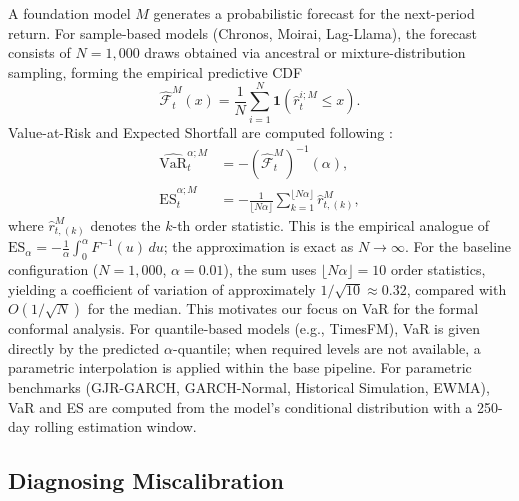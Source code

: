 \documentclass[preprint,11pt,authoryear]{elsarticle}
\newcommand{\VaR}{\mathrm{VaR}}
\newcommand{\ES}{\mathrm{ES}}
\newcommand{\1}{\boldsymbol{1}}
\newcommand{\Fhat}{\hat{\mathcal{F}}}
\begin{document}
	A foundation model $M$ generates a probabilistic forecast for
	the next-period return. For sample-based models (Chronos,
	Moirai, Lag-Llama), the forecast consists of $N=1{,}000$ draws
	obtained via ancestral or mixture-distribution sampling,
	forming the empirical predictive CDF
	\[
	\Fhat_t^M(x) = \frac{1}{N}\sum_{i=1}^{N}
	\1(\hat{r}_t^{i;M}\leq x).
	\]
	Value-at-Risk and Expected Shortfall are computed following
	\citet{pele2025llmvar}:
	\begin{align}
		\widehat{\VaR}_t^{\alpha;M}
		&= -(\Fhat_t^M)^{-1}(\alpha), \\
		\widehat{\ES}_t^{\alpha;M}
		&= -\frac{1}{\lfloor N\alpha\rfloor}
		\sum_{k=1}^{\lfloor N\alpha\rfloor}\hat{r}_{t,(k)}^M,
	\end{align}
	where $\hat{r}_{t,(k)}^M$ denotes the $k$-th order statistic.
	This is the empirical analogue of
	$\ES_\alpha = -\frac{1}{\alpha}\int_0^\alpha F^{-1}(u)\,du$;
	the approximation is exact as $N \to \infty$.
	For the baseline configuration ($N = 1{,}000$,
	$\alpha = 0.01$), the sum uses $\lfloor N\alpha \rfloor = 10$
	order statistics, yielding a coefficient of variation of
	approximately $1/\sqrt{10} \approx 0.32$, compared with
	$O(1/\sqrt{N})$ for the median. This motivates our focus on
	VaR for the formal conformal analysis.
	For quantile-based models (e.g., TimesFM), VaR is given
	directly by the predicted $\alpha$-quantile; when required
	levels are not available, a parametric interpolation is applied
	within the base pipeline. For parametric benchmarks
	(GJR-GARCH, GARCH-Normal, Historical Simulation, EWMA), VaR
	and ES are computed from the model's conditional distribution
	with a 250-day rolling estimation window.
	
	\subsection{Diagnosing Miscalibration}
	\label{sec:diag}
	
\end{document}
